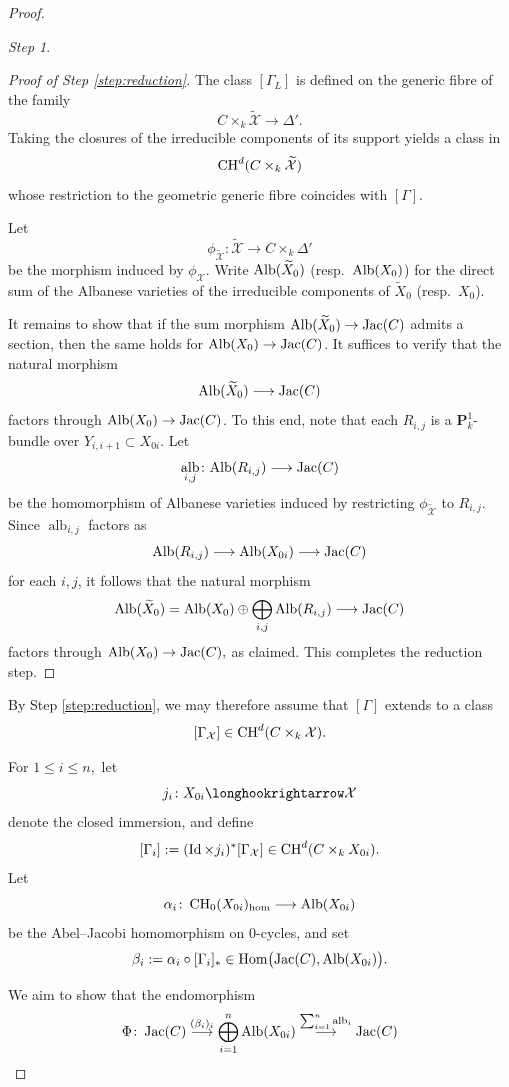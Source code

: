 \documentclass[11pt,letterpaper]{amsart}
\newcommand{\Alb}{\textnormal{Alb}}
\newcommand{\CH}{\textnormal{CH}}
\numberwithin{equation}{section}
\theoremstyle{definition}
\theoremstyle{remark}
\newtheorem{step}{Step}
\newcommand{\bbP}{\mathbf{P}}
\DeclareMathOperator{\al}{alb}
\newcommand{\Ch}{\operatorname{CH_{0}}}
\DeclareMathOperator{\Hom}{Hom}
\DeclareMathOperator{\Id}{Id}
\DeclareMathOperator{\jac}{Jac}
\begin{document}
\begin{proof}
\begin{step}
\begin{proof}[Proof of Step \ref{step:reduction}]
The class $[\Gamma_{L}]$ is defined on the generic fibre of the family $$C\times_{k}\widetilde{\mathcal{X}}\longrightarrow\Delta'.$$ Taking the closures of the irreducible components of its support yields a class in $$\CH^{d}(C\times_{k}\mathcal{\widetilde{X}})$$ whose restriction to the geometric generic fibre coincides with $[\Gamma]$.

Let $$\phi_{\widetilde{\mathcal{X}}}\colon\widetilde{\mathcal{X}}\longrightarrow C\times_{k}\Delta'$$ be the morphism induced by $\phi_{\mathcal{X}}.$ Write $\Alb(\widetilde{X}_{0})$ (resp.\ $\Alb(X_{0})$) for the direct sum of the Albanese varieties of the irreducible components of $\widetilde{X}_0$ (resp.\ $X_0$). 
\par
It remains to show that if the sum morphism $\Alb(\widetilde X_0) \to \jac(C)$ admits a section, then the same holds for $\Alb(X_0) \to \jac(C)$. It suffices to verify that the natural morphism $$\Alb(\widetilde X_0) \longrightarrow \jac(C)$$ factors through $\Alb(X_0)\to\jac(C)$. To this end, note that each $R_{i,j}$ is a $\bbP^{1}_{k}$-bundle over $Y_{i,i+1}\subset X_{0i}.$ Let $$\al_{i,j}\colon\Alb(R_{i,j})\longrightarrow\jac(C)$$ be the homomorphism of Albanese varieties induced by restricting $\phi_{\widetilde{\mathcal{X}}}$ to $R_{i,j}$. Since $\al_{i,j}$ factors as $$\Alb(R_{i,j}) \longrightarrow \Alb(X_{0i}) \longrightarrow \jac(C)$$ for each $i,j$, it follows that the natural morphism $$\Alb(\widetilde{X}_0) = \Alb(X_0) \oplus \bigoplus_{i,j} \Alb(R_{i,j}) \longrightarrow \jac(C)$$ factors through $\Alb(X_0)\to\jac(C),$ as claimed. This completes the reduction step.
\end{proof}    
\end{step}
By Step \ref{step:reduction}, we may therefore assume that $[\Gamma]$ extends to a class $$[\Gamma_{\mathcal{X}}]\in\CH^{d}(C\times_{k}\mathcal{X}).$$ \par
For $1\leq i\leq n,$ let $$j_{i}\colon X_{0i}\longhookrightarrow\mathcal{X}$$ denote the closed immersion, and define $$[\Gamma_{i}]:=(\Id\times j_{i})^{\ast}[\Gamma_{\mathcal{X}}]\in\CH^{d}(C\times_{k}X_{0i}).$$ Let $$\alpha_{i}\colon\Ch(X_{0i})_{\hom}\longrightarrow\Alb(X_{0i})$$ be the Abel--Jacobi homomorphism on $0$-cycles, and set $$\beta_{i}:=\alpha_{i}\circ[\Gamma_{i}]_{\ast}\in\Hom\bigl(\jac(C),\Alb(X_{0i})\bigr).$$\par
We aim to show that the endomorphism 
\begin{equation}\label{eq:end}
\Phi\colon \jac(C)\overset{(\beta_{i})_{i}}{\longrightarrow}\bigoplus_{i=1}^{n}\Alb(X_{0i})\overset{\sum_{i=1}^{n}\al_{i}}{\longrightarrow} \jac(C)

\end{equation}
\end{proof}
\end{document}
